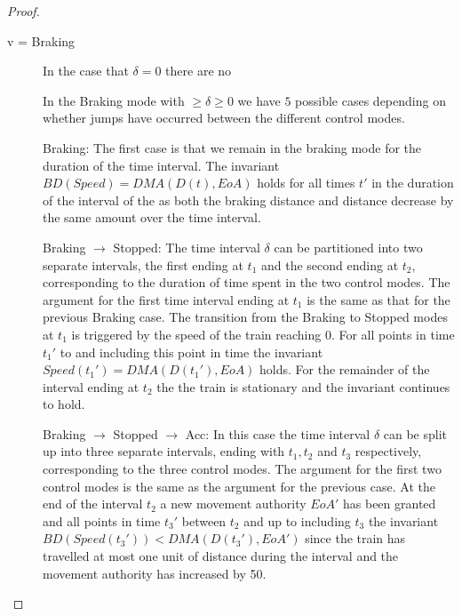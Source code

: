 \begin{mytheorem}
\begin{proof}
\begin{description}
\item[v = Braking]
In the case that $\delta = 0$ there are no 

In the Braking mode with  $\geq \delta \geq 0$ we have $5$ possible cases depending on whether jumps have occurred between the different control modes.

\begin{comment}In the Braking mode there are two cases either $MA.TID.y \wedge Speed > 0$ or $Speed = 0$. Since the train is braking by the definition of $BD$,  $D(t_2) \leq BD(Speed,t_2)$ will continue to hold for any amount of time in this state.  In the case that $MA.TID.y \wedge Speed > 0$ we receive a new movement authority $y$ with $y < EoA$ and a jump is performed to the $Accelerating$ mode with $D(t_2) \leq BD(Speed', t_2) < y$. In the case that $Speed = 0$ a jump occurs to the $Stopped$ state.
\end{comment}

Braking: The first case is that we remain in the braking mode for the duration of the time interval. The invariant $BD(Speed) = DMA(D(t), EoA)$ holds for all times $t'$ in the duration of the interval of the as both the braking distance and distance decrease by the same amount over the time interval.

Braking $\to$ Stopped: The time interval $\delta$ can be partitioned into two separate intervals, the first ending at $t_1$ and the second ending at $t_2$, corresponding to the duration of time spent in the two control modes.  The argument for the first time interval  ending at $t_1$ is the same as that for the previous Braking case. 
The transition from the Braking to Stopped modes at $t_1$ is triggered by the speed of the train reaching $0$. For all points in time $t_1'$ to and including this point in time the invariant $Speed(t_1') = DMA(D(t_1'), EoA)$ holds. For the remainder of the interval ending at $t_2$ the the train is stationary and the invariant continues to hold. 

Braking $\to$ Stopped $\to$ Acc: In this case the time interval $\delta$ can be split up into three separate intervals, ending with $t_1,t_2$ and $t_3$  respectively, corresponding to the three control modes. The argument for the first two control modes is the same as the argument for the previous case. 
At the end of the interval $t_2$ a new movement authority $EoA'$ has been granted and all points in time $t_3'$ between $t_2$ and up to including $t_3$ the invariant $BD(Speed(t_3')) < DMA(D(t_3'), EoA')$ since the train has travelled at most one unit of distance during the interval and the movement authority has increased by 50.


\end{description}
\end{proof}
\end{mytheorem}
